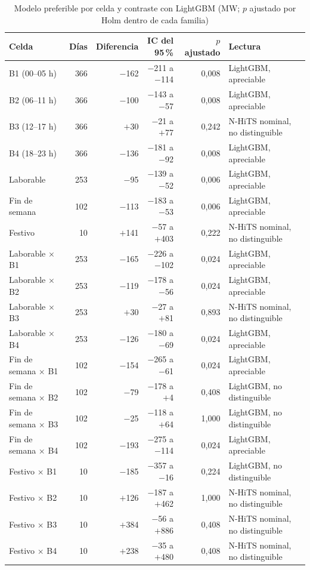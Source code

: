 \begin{table}[H]
	\centering
	\caption{Modelo preferible por celda y contraste con LightGBM (MW; $p$ ajustado por Holm dentro de cada familia)}
	\label{tab:desg-pref}
	\small
	\setlength{\tabcolsep}{3pt}
	\begin{tabular}{lrrrr>{\raggedright\arraybackslash}p{4.1cm}}
		\hline
		\textbf{Celda} & \textbf{Días} & \textbf{Diferencia} & \textbf{IC del 95\,\%} & \textbf{$p$ ajustado} & \textbf{Lectura} \\
		\hline
		B1 (00--05 h) & 366 & $-$162 & $-$211 a $-$114 & 0,008 & LightGBM, apreciable \\
		B2 (06--11 h) & 366 & $-$100 & $-$143 a $-$57 & 0,008 & LightGBM, apreciable \\
		B3 (12--17 h) & 366 & $+$30 & $-$21 a $+$77 & 0,242 & N-HiTS nominal, no distinguible \\
		B4 (18--23 h) & 366 & $-$136 & $-$181 a $-$92 & 0,008 & LightGBM, apreciable \\
		\hline
		Laborable & 253 & $-$95 & $-$139 a $-$52 & 0,006 & LightGBM, apreciable \\
		Fin de semana & 102 & $-$113 & $-$183 a $-$53 & 0,006 & LightGBM, apreciable \\
		Festivo & 10 & $+$141 & $-$57 a $+$403 & 0,222 & N-HiTS nominal, no distinguible \\
		\hline
		Laborable $\times$ B1 & 253 & $-$165 & $-$226 a $-$102 & 0,024 & LightGBM, apreciable \\
		Laborable $\times$ B2 & 253 & $-$119 & $-$178 a $-$56 & 0,024 & LightGBM, apreciable \\
		Laborable $\times$ B3 & 253 & $+$30 & $-$27 a $+$81 & 0,893 & N-HiTS nominal, no distinguible \\
		Laborable $\times$ B4 & 253 & $-$126 & $-$180 a $-$69 & 0,024 & LightGBM, apreciable \\
		Fin de semana $\times$ B1 & 102 & $-$154 & $-$265 a $-$61 & 0,024 & LightGBM, apreciable \\
		Fin de semana $\times$ B2 & 102 & $-$79 & $-$178 a $+$4 & 0,408 & LightGBM, no distinguible \\
		Fin de semana $\times$ B3 & 102 & $-$25 & $-$118 a $+$64 & 1,000 & LightGBM, no distinguible \\
		Fin de semana $\times$ B4 & 102 & $-$193 & $-$275 a $-$114 & 0,024 & LightGBM, apreciable \\
		Festivo $\times$ B1 & 10 & $-$185 & $-$357 a $-$16 & 0,224 & LightGBM, no distinguible \\
		Festivo $\times$ B2 & 10 & $+$126 & $-$187 a $+$462 & 1,000 & N-HiTS nominal, no distinguible \\
		Festivo $\times$ B3 & 10 & $+$384 & $-$56 a $+$886 & 0,408 & N-HiTS nominal, no distinguible \\
		Festivo $\times$ B4 & 10 & $+$238 & $-$35 a $+$480 & 0,408 & N-HiTS nominal, no distinguible \\
		\hline
	\end{tabular}
\end{table}

